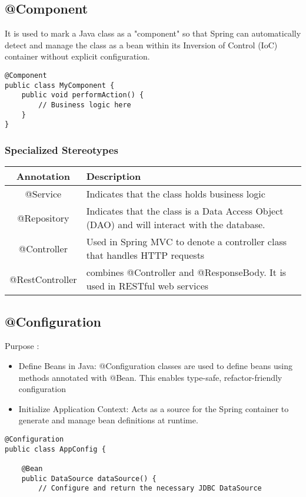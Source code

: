 \documentclass[a4paper, 12pt]{article}
\begin{document}
    \subsection{@Component}
    It is used to mark a Java class as a "component" so that Spring can automatically detect and manage the class as a bean within its Inversion of Control (IoC) container without explicit configuration.
    \begin{lstlisting}
@Component
public class MyComponent {
    public void performAction() {
        // Business logic here
    }
}
    \end{lstlisting}

    \subsubsection{Specialized Stereotypes}
    \begin{table}[h!]
        \centering
        \begin{tabular}{|c|p{10cm}|}
            \hline
            Annotation      & Description                                                                                 \\ \hline
            @Service        & Indicates that the class holds business logic                                               \\ \hline
            @Repository     & Indicates that the class is a Data Access Object (DAO) and will interact with the database. \\ \hline
            @Controller     & Used in Spring MVC to denote a controller class that handles HTTP requests                  \\ \hline
            @RestController & combines @Controller and @ResponseBody. It is used in RESTful web services                  \\ \hline
        \end{tabular}
        \label{tab:Annotation}
    \end{table}

    \newpage

    \subsection{@Configuration}
    Purpose :
    \begin{itemize}
        \item Define Beans in Java: @Configuration classes are used to define beans using methods annotated with @Bean. This enables type-safe, refactor-friendly configuration
        \item Initialize Application Context: Acts as a source for the Spring container to generate and manage bean definitions at runtime.
    \end{itemize}
    \begin{lstlisting}
@Configuration
public class AppConfig {

    @Bean
    public DataSource dataSource() {
        // Configure and return the necessary JDBC DataSource
    \end{lstlisting}
\end{document}
